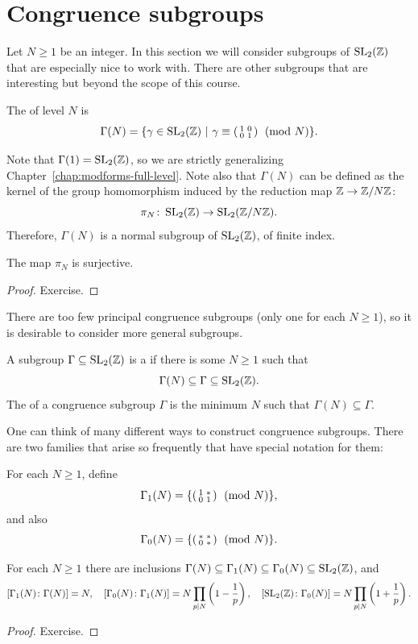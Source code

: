 \section{Congruence subgroups}
\label{sec:congruence-subgroups}

Let $N\geq 1$ be an integer. In this section we will consider subgroups of $\operatorname{SL}_2(\mathbb{Z})$ that are especially nice to work with. There are other subgroups that are interesting but beyond the scope of this course.
\begin{definition}
  The  of level $N$ is
\[
\Gamma(N)=\{ \gamma\in\operatorname{SL}_2(\mathbb{Z})~|~ \gamma\equiv \left(\begin{smallmatrix}1&0\\0&1\end{smallmatrix}\right) \pmod{N}\}.
\]
\end{definition}

Note that $\Gamma(1)=\operatorname{SL}_2(\mathbb{Z})$, so we are strictly generalizing Chapter~\ref{chap:modforms-full-level}. Note also that $\Gamma(N)$ can be defined as the kernel of the group homomorphism induced by the reduction map $\mathbb{Z}\to \mathbb{Z}/N\mathbb{Z}$:
\[
\pi_N\colon \operatorname{SL}_2(\mathbb{Z})\to \operatorname{SL}_2(\mathbb{Z}/N\mathbb{Z}).
\]
Therefore, $\Gamma(N)$ is a normal subgroup of $\operatorname{SL}_2(\mathbb{Z})$, of finite index.
\begin{proposition}
  The map $\pi_N$ is surjective.
\end{proposition}
\begin{proof}
  Exercise.
\end{proof}
There are too few principal congruence subgroups (only one for each $N\geq 1$), so it is desirable to consider more general subgroups.
\begin{definition}
  A subgroup $\Gamma\subseteq \operatorname{SL}_2(\mathbb{Z})$ is a  if there is some $N\geq 1$ such that
\[
\Gamma(N)\subseteq \Gamma \subseteq \operatorname{SL}_2(\mathbb{Z}).
\]
The  of a congruence subgroup $\Gamma$ is the minimum $N$ such that $\Gamma(N)\subseteq \Gamma$.
\end{definition}

One can think of many different ways to construct congruence subgroups. There are two families that arise so frequently that have special notation for them:

\begin{example}
For each $N\geq 1$, define
  \[
\Gamma_1(N)=\{\left(\begin{smallmatrix}1&*\\0&1\end{smallmatrix}\right)\pmod N\},
\]
and also
  \[
\Gamma_0(N)=\{\left(\begin{smallmatrix}*&*\\0&*\end{smallmatrix}\right)\pmod N\}.
\]
\end{example}

\begin{lemma}
  For each $N\geq 1$ there are inclusions
$\Gamma(N) \subseteq \Gamma_1(N) \subseteq \Gamma_0(N) \subseteq \operatorname{SL}_2(\mathbb{Z})$,
and
\[
[\Gamma_1(N)\colon \Gamma(N)] = N,\quad [\Gamma_0(N)\colon \Gamma_1(N)] = N\prod_{p\mid N} \left(1-\frac 1p\right),\quad [\operatorname{SL}_2(\mathbb{Z})\colon \Gamma_0(N)] = N\prod_{p\mid N} \left(1+\frac 1p\right).
\]
\end{lemma}
\begin{proof}
  Exercise.
\end{proof}

